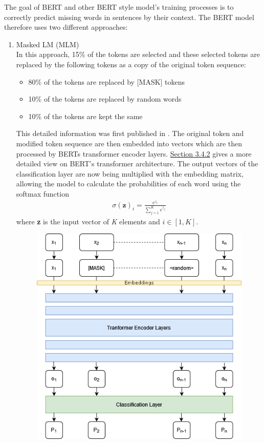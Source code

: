 The goal of BERT and other BERT style model's training processes is to correctly predict missing words in sentences by their context. The BERT model therefore uses two different approaches:
\begin{enumerate}
    \item Masked LM (MLM) \\
    In this approach, 15\% of the tokens are selected and these selected tokens are replaced by the following tokens as a copy of the original token sequence:
    \begin{itemize}
        \item 80\% of the tokens are replaced by [MASK] tokens
        \item 10\% of the tokens are replaced by random words
        \item 10\% of the tokens are kept the same
    \end{itemize}
    This detailed information was first published in \citet{DevlinPres}.
    The original token and modified token sequence are then embedded into vectors which are then processed by BERTs transformer encoder layers. \hyperref[sec:transformer]{Section 3.4.2} gives a more detailed view on BERT's transformer architecture. The output vectors of the classification layer are now being multiplied with the embedding matrix, allowing the model to calculate the probabilities of each word using the softmax function 
    \begin{align}
        \sigma(\textbf{z})_i = \frac{e^{z_i}}{\sum^K_{j=1} e^{z_j}}
    \end{align}
    where \textbf{z} is the input vector of \emph{K} elements and $i \in [1,K]$.
    \begin{figure}[h]
        \centering 
        \includegraphics [width=\linewidth]{resources/BERT_MLM.png}
        \label{fig:my_label}
    \end{figure}
   

\end{enumerate}
